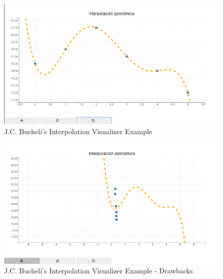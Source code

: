 \begin{figure}[H]
    \centering
    \includegraphics[width=\textwidth]{Include/Images/Thesis/Development/Visualizers/INTERPOLATION VISUALIZER/Camilo.Interpolation.Ex1.png}
    \caption{J.C. Bucheli's \cite{bucheli2020} Interpolation Visualizer Example}
    \label{fig:J.C. Bucheli's Interpolation Visualizer Example}
\end{figure}

\begin{figure}[H]
    \centering
    \includegraphics[width=\textwidth]{Include/Images/Thesis/Development/Visualizers/INTERPOLATION VISUALIZER/Camilo.Interpolation.Ex1.1.png}
    \caption{J.C. Bucheli's \cite{bucheli2020} Interpolation Visualizer Example - Drawbacks}
    \label{fig:J.C. Bucheli's Interpolation Visualizer Example - Drawbacks}
\end{figure}


